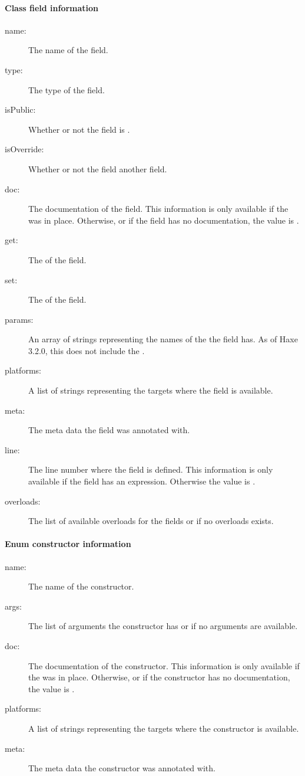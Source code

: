 	
\paragraph{Class field information}
\label{cr-rtti-class-field-information}

\begin{description}
	\item[name:] The name of the field.
	\item[type:] The type of the field.
	\item[isPublic:] Whether or not the field is .
	\item[isOverride:] Whether or not the field  another field.
	\item[doc:] The documentation of the field. This information is only available if the   was in place. Otherwise, or if the field has no documentation, the value is .
	\item[get:] The  of the field.
	\item[set:] The  of the field.
	\item[params:] An array of strings representing the names of the  the field has. As of Haxe 3.2.0, this does not include the .
	\item[platforms:] A list of strings representing the targets where the field is available.
	\item[meta:] The meta data the field was annotated with.
	\item[line:] The line number where the field is defined. This information is only available if the field has an expression. Otherwise the value is .
	\item[overloads:] The list of available overloads for the fields or  if no overloads exists.
\end{description}

\paragraph{Enum constructor information}
\label{cr-rtti-enum-constructor-information}

\begin{description}
	\item[name:] The name of the constructor.
	\item[args:] The list of arguments the constructor has or  if no arguments are available.
	\item[doc:] The documentation of the constructor. This information is only available if the   was in place. Otherwise, or if the constructor has no documentation, the value is .
	\item[platforms:] A list of strings representing the targets where the constructor is available.
	\item[meta:] The meta data the constructor was annotated with.
\end{description}
